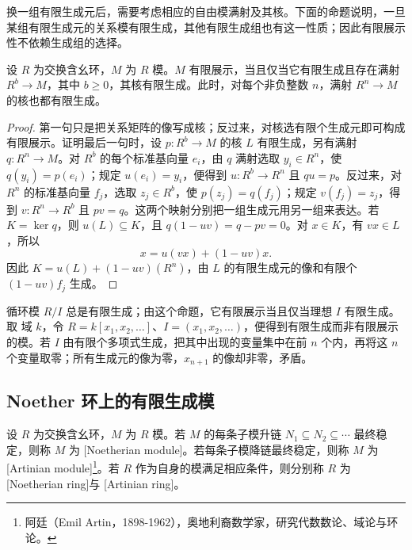 \ProseParagraphBreak
换一组有限生成元后，需要考虑相应的自由模满射及其核。下面的命题说明，一旦某组有限生成元的关系模有限生成，其他有限生成组也有这一性质；因此有限展示性不依赖生成组的选择。

\begin{proposition}\label{b3:prop:finite-presentation-kernel}
	设 \(R\) 为交换含幺环，\(M\) 为 \(R\) 模。\(M\) 有限展示，当且仅当它有限生成且存在满射 \(R^b\rightarrow M\)，其中 \(b\ge0\)，其核有限生成。此时，对每个非负整数 \(n\)，满射 \(R^n\rightarrow M\) 的核也都有限生成。
\end{proposition}
\begin{proof}
	第一句只是把关系矩阵的像写成核；反过来，对核选有限个生成元即可构成有限展示。证明最后一句时，设 \(p:R^b\rightarrow M\) 的核 \(L\) 有限生成，另有满射 \(q:R^n\rightarrow M\)。对 \(R^b\) 的每个标准基向量 \(e_i\)，由 \(q\) 满射选取 \(y_i\in R^n\)，使 \(q(y_i)=p(e_i)\)；规定 \(u(e_i)=y_i\)，便得到 \(u:R^b\rightarrow R^n\) 且 \(qu=p\)。反过来，对 \(R^n\) 的标准基向量 \(f_j\)，选取 \(z_j\in R^b\)，使 \(p(z_j)=q(f_j)\)；规定 \(v(f_j)=z_j\)，得到 \(v:R^n\rightarrow R^b\) 且 \(pv=q\)。这两个映射分别把一组生成元用另一组来表达。若 \(K=\ker q\)，则 \(u(L)\subseteq K\)，且 \(q(1-uv)=q-pv=0\)。对 \(x\in K\)，有 \(vx\in L\)，所以
	\[
		x=u(vx)+(1-uv)x.
	\]
	因此 \(K=u(L)+(1-uv)(R^n)\)，由 \(L\) 的有限生成元的像和有限个 \((1-uv)f_j\) 生成。
\end{proof}

循环模 \(R/I\) 总是有限生成；由这个命题，它有限展示当且仅当理想 \(I\) 有限生成。取 域 \(k\)，令 \(R=k[x_1,x_2,\ldots]\)、\(I=(x_1,x_2,\ldots)\)，便得到有限生成而非有限展示的模。若 \(I\) 由有限个多项式生成，把其中出现的变量集中在前 \(n\) 个内，再将这 \(n\) 个变量取零；所有生成元的像为零，\(x_{n+1}\) 的像却非零，矛盾。

\subsection{Noether 环上的有限生成模}
\label{b3:subsec:0301:02}

\begin{definition}\label{b3:def:noether-artin-module}
	设 \(R\) 为交换含幺环，\(M\) 为 \(R\) 模。若 \(M\) 的每条子模升链 \(N_1\subseteq N_2\subseteq\cdots\) 最终稳定，则称 \(M\) 为 [Noetherian module]。若每条子模降链最终稳定，则称 \(M\) 为 [Artinian module]\footnote{阿廷（Emil Artin，1898-1962），奥地利裔数学家，研究代数数论、域论与环论。}。若 \(R\) 作为自身的模满足相应条件，则分别称 \(R\) 为 [Noetherian ring]与 [Artinian ring]。
\end{definition}

